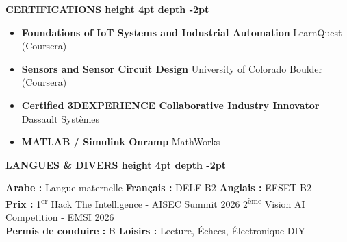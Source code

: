 \documentclass[10pt,a4paper]{altacv}
\renewcommand{\cvsection}[2][]{%
  \medskip%
  {\color{heading}\LARGE\bfseries #2 \hspace{0.2em}\leaders\vrule height 4pt depth -2pt\hfill\mbox{}}\par\smallskip
}
\begin{document}
\cvsection{CERTIFICATIONS}
\begin{itemize}[leftmargin=*, label=\textbullet, itemsep=2pt]
  \item \textbf{Foundations of IoT Systems and Industrial Automation} \hfill {\color{emphasis}LearnQuest (Coursera)}
  \item \textbf{Sensors and Sensor Circuit Design} \hfill {\color{emphasis}University of Colorado Boulder (Coursera)}
  \item \textbf{Certified 3DEXPERIENCE Collaborative Industry Innovator} \hfill {\color{emphasis}Dassault Systèmes}
  \item \textbf{MATLAB / Simulink Onramp} \hfill {\color{emphasis}MathWorks}
\end{itemize}

\cvsection{LANGUES \& DIVERS}
\textbf{Arabe :} Langue maternelle \hfill \textbf{Français :} DELF B2 \hfill \textbf{Anglais :} EFSET B2\\[2pt]
\textbf{Prix :} 1\textsuperscript{er} Hack The Intelligence - AISEC Summit 2026 \hfill 2\textsuperscript{ème} Vision AI Competition - EMSI 2026\\[2pt]
\textbf{Permis de conduire :} B \hfill \textbf{Loisirs :} Lecture, Échecs, Électronique DIY
\end{document}
